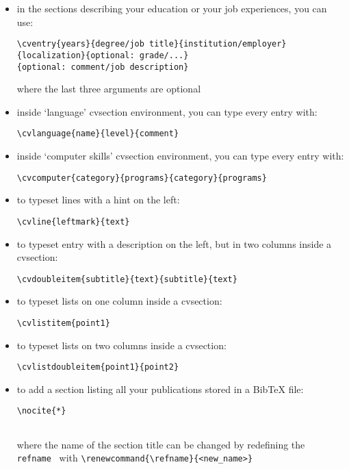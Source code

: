 \documentclass[a4paper,11pt]{article}
\newcommand{\Code}[1]{\lstinline!#1!~} %
\begin{document}
\begin{itemize}
 \item in the sections describing your education or your job experiences, you can use:
 \begin{verbatim}
\cventry{years}{degree/job title}{institution/employer}
{localization}{optional: grade/...}
{optional: comment/job description}
  \end{verbatim} 
\vspace{-20pt}  
where the last three arguments are optional
 \item inside `language' cvsection environment, you can type every entry with:
 \begin{verbatim}
\cvlanguage{name}{level}{comment}
 \end{verbatim}
 \item inside `computer skills' cvsection environment, you can type every entry with:
 \begin{verbatim}
\cvcomputer{category}{programs}{category}{programs}
 \end{verbatim}
 \item to typeset lines with a hint on the left:
 \begin{verbatim}
\cvline{leftmark}{text}
 \end{verbatim}
 \item to typeset entry with a description on the left, but in two columns inside a cvsection:
 \begin{verbatim}
\cvdoubleitem{subtitle}{text}{subtitle}{text}
 \end{verbatim}
 \item to typeset lists on one column inside a cvsection:
 \begin{verbatim}
\cvlistitem{point1}
 \end{verbatim}
 \item to typeset lists on two columns inside a cvsection:
 \begin{verbatim}
\cvlistdoubleitem{point1}{point2}
 \end{verbatim}
 \item to add a section listing all your publications stored in a BibTeX file:
 \begin{verbatim}
\nocite{*}


 \end{verbatim}
\vspace{-20pt}
 where the name of the section title can be changed by redefining the \Code{refname} with  \verb|\renewcommand{\refname}{<new_name>}|
\end{itemize}
\end{document}
